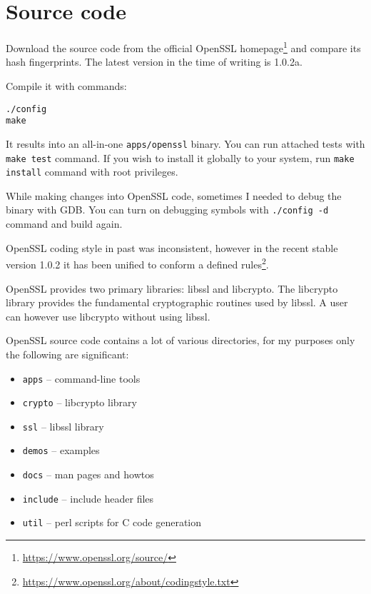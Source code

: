 \section{Source code}

Download the source code from the official OpenSSL homepage\footnote{\url{https://www.openssl.org/source/}} and compare its hash fingerprints. The latest version in the time of writing is 1.0.2a.

Compile it with commands:

\begin{verbatim}
./config
make
\end{verbatim}

It results into an all-in-one \texttt{apps/openssl} binary. You can run attached tests with \texttt{make test} command. If you wish to install it globally to your system, run \texttt{make install} command with root privileges.

While making changes into OpenSSL code, sometimes I needed to debug the binary with GDB. You can turn on debugging symbols with \texttt{./config -d} command and build again.

OpenSSL coding style in past was inconsistent, however in the recent stable version 1.0.2 it has been unified to conform a defined rules\footnote{\url{https://www.openssl.org/about/codingstyle.txt}}.

OpenSSL provides two primary libraries: libssl and libcrypto. The libcrypto library provides the fundamental cryptographic routines used by libssl. A user can however use libcrypto without using libssl.

OpenSSL source code contains a lot of various directories, for my purposes only the following are significant:

\begin{itemize}
  \item \texttt{apps} -- command-line tools
  \item \texttt{crypto} -- libcrypto library
  \item \texttt{ssl} -- libssl library
  \item \texttt{demos} -- examples
  \item \texttt{docs} -- man pages and howtos
  \item \texttt{include} -- include header files
  \item \texttt{util} -- perl scripts for C code generation
\end{itemize}
